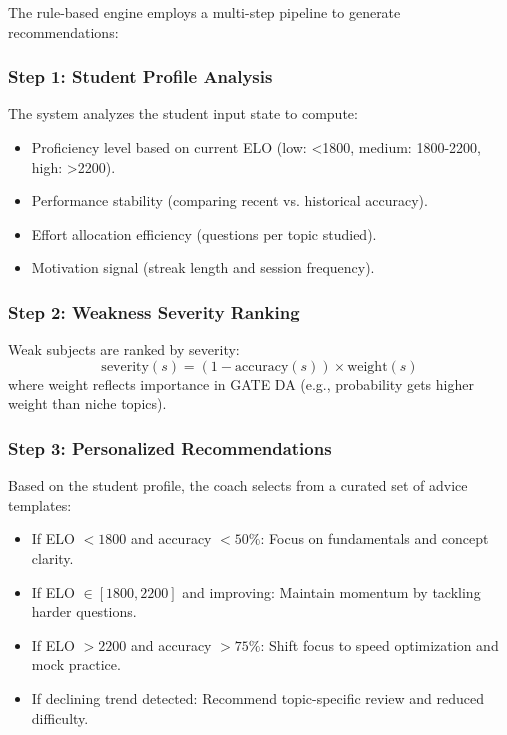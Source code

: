 \documentclass[sigconf,authordraft,twoside]{acmart}
\begin{document}
The rule-based engine employs a multi-step pipeline to generate recommendations:

\subsubsection{Step 1: Student Profile Analysis}
The system analyzes the student input state to compute:
\begin{itemize}
\item Proficiency level based on current ELO (low: <1800, medium: 1800-2200, high: >2200).
\item Performance stability (comparing recent vs. historical accuracy).
\item Effort allocation efficiency (questions per topic studied).
\item Motivation signal (streak length and session frequency).
\end{itemize}

\subsubsection{Step 2: Weakness Severity Ranking}
Weak subjects are ranked by severity:
\begin{equation}
\text{severity}(s) = (1 - \text{accuracy}(s)) \times \text{weight}(s)
\end{equation}
where weight reflects importance in GATE DA (e.g., probability gets higher weight than niche topics).

\subsubsection{Step 3: Personalized Recommendations}
Based on the student profile, the coach selects from a curated set of advice templates:
\begin{itemize}
\item If ELO $< 1800$ and accuracy $< 50\%$: Focus on fundamentals and concept clarity.
\item If ELO $\in [1800, 2200]$ and improving: Maintain momentum by tackling harder questions.
\item If ELO $> 2200$ and accuracy $> 75\%$: Shift focus to speed optimization and mock practice.
\item If declining trend detected: Recommend topic-specific review and reduced difficulty.
\end{itemize}
\end{document}
